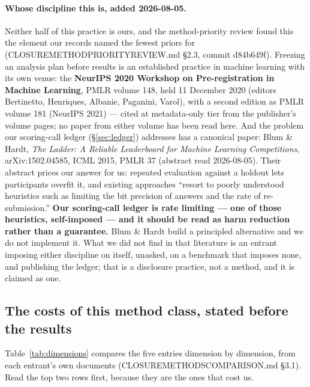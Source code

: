 \documentclass[11pt,a4paper]{article}
\newcommand{\breakus}{\textunderscore\allowbreak}
\newcommand{\code}[1]{{\small\ttfamily\let\_\breakus #1}}
\newcommand{\artifact}[1]{{\footnotesize\ttfamily\let\_\breakus #1}}
\begin{document}
\paragraph{Whose discipline this is, added 2026-08-05.} Neither half of this practice is
ours, and the method-priority review found this the element our records named the fewest
priors for (\artifact{CLOSURE\_METHOD\_PRIORITY\_REVIEW.md} \S2.3, commit
\code{d84b649f}). Freezing an analysis plan before results is an established practice in
machine learning with its own venue: the \textbf{NeurIPS 2020 Workshop on
Pre-registration in Machine Learning}, PMLR volume 148, held 11 December 2020 (editors
Bertinetto, Henriques, Albanie, Paganini, Varol), with a second edition as PMLR volume
181 (NeurIPS 2021) --- cited at metadata-only tier from the publisher's volume pages; no
paper from either volume has been read here. And the problem our scoring-call ledger
(\S\ref{sec:ledger}) addresses has a canonical paper: Blum \& Hardt, \emph{The Ladder: A
Reliable Leaderboard for Machine Learning Competitions}, arXiv:1502.04585, ICML 2015,
PMLR 37 (abstract read 2026-08-05). Their abstract prices our answer for us: repeated
evaluation against a holdout lets participants overfit it, and existing approaches
``resort to poorly understood heuristics such as limiting the bit precision of answers
and the rate of re-submission.'' \textbf{Our scoring-call ledger is rate limiting --- one of
those heuristics, self-imposed --- and it should be read as harm reduction rather than a
guarantee.} Blum \& Hardt build a principled alternative and we do not implement it. What
we did not find in that literature is an entrant imposing either discipline on itself,
unasked, on a benchmark that imposes none, and publishing the ledger; that is a
disclosure practice, not a method, and it is claimed as one.

\subsection{The costs of this method class, stated before the results}

Table~\ref{tab:dimensions} compares the five entries dimension by dimension, from each
entrant's own documents (\artifact{CLOSURE\_METHODS\_COMPARISON.md} \S3.1). Read the top
two rows first, because they are the ones that cost us.
\end{document}
